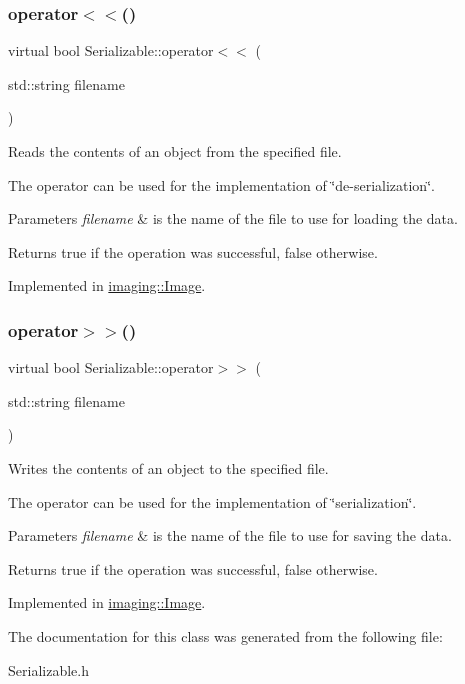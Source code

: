 \subsubsection{\texorpdfstring{operator$<$$<$()}{operator<<()}}
{\footnotesize\ttfamily virtual bool Serializable\+::operator$<$$<$ (\begin{DoxyParamCaption}\item[{std\+::string}]{filename }\end{DoxyParamCaption})\hspace{0.3cm}{\ttfamily [pure virtual]}}

Reads the contents of an object from the specified file.

The operator can be used for the implementation of \char`\"{}de-\/serialization\char`\"{}.


\begin{DoxyParams}{Parameters}
{\em filename} & is the name of the file to use for loading the data.\\
\hline
\end{DoxyParams}
\begin{DoxyReturn}{Returns}
true if the operation was successful, false otherwise. 
\end{DoxyReturn}


Implemented in \hyperlink{classimaging_1_1_image_ac9ad6b7cf9eabf0c99decc03dac24694}{imaging\+::\+Image}.

\mbox{\label{class_serializable_a60c53d8ec7e38531699d1ca19642318d}} 
\subsubsection{\texorpdfstring{operator$>$$>$()}{operator>>()}}
{\footnotesize\ttfamily virtual bool Serializable\+::operator$>$$>$ (\begin{DoxyParamCaption}\item[{std\+::string}]{filename }\end{DoxyParamCaption})\hspace{0.3cm}{\ttfamily [pure virtual]}}

Writes the contents of an object to the specified file.

The operator can be used for the implementation of \char`\"{}serialization\char`\"{}.


\begin{DoxyParams}{Parameters}
{\em filename} & is the name of the file to use for saving the data.\\
\hline
\end{DoxyParams}
\begin{DoxyReturn}{Returns}
true if the operation was successful, false otherwise. 
\end{DoxyReturn}


Implemented in \hyperlink{classimaging_1_1_image_aeaf5fcad3d1b49a0f127e0d88dfce5e3}{imaging\+::\+Image}.



The documentation for this class was generated from the following file\+:\begin{DoxyCompactItemize}
\item 
Serializable.\+h\end{DoxyCompactItemize}

